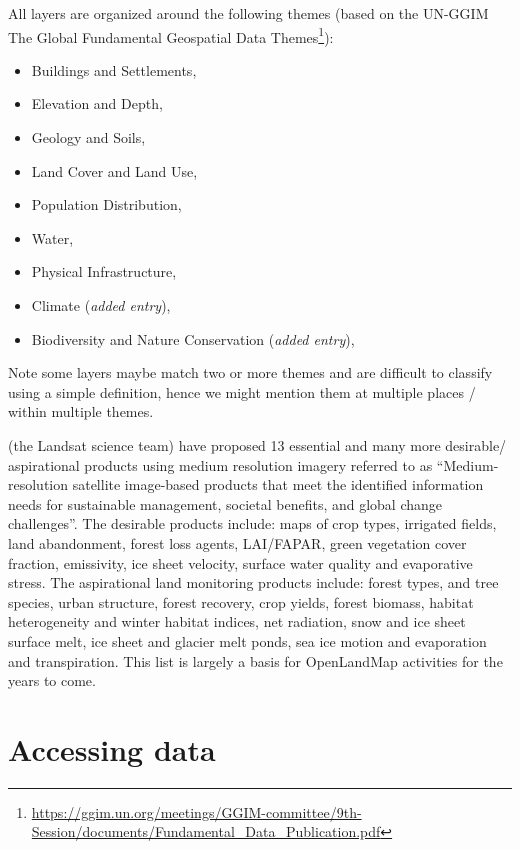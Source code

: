 \documentclass[
  graybox,natbib,nospthms]{svmono}
\providecommand{\tightlist}{%
  \setlength{\itemsep}{0pt}\setlength{\parskip}{0pt}}
\providecommand{\tightlist}{\setlength{\itemsep}{0pt}\setlength{\parskip}{0pt}}
\renewcommand{\href}[2]{#2 (\url{#1})}
\renewcommand{\href}[2]{#2\footnote{\url{#1}}}
\begin{document}
All layers are organized around the following themes
(based on the \href{https://ggim.un.org/meetings/GGIM-committee/9th-Session/documents/Fundamental_Data_Publication.pdf}{UN-GGIM The Global Fundamental Geospatial Data Themes}):

\begin{itemize}
\tightlist
\item
  Buildings and Settlements,
\item
  Elevation and Depth,
\item
  Geology and Soils,
\item
  Land Cover and Land Use,
\item
  Population Distribution,
\item
  Water,
\item
  Physical Infrastructure,
\item
  Climate (\emph{added entry}),
\item
  Biodiversity and Nature Conservation (\emph{added entry}),
\end{itemize}

Note some layers maybe match two or more themes and are difficult to classify using a
simple definition, hence we might mention them at multiple places / within multiple themes.

\citet{RADELOFF2024113918} (the Landsat science team) have proposed 13 essential and
many more desirable/ aspirational products using medium resolution imagery referred
to as ``Medium-resolution satellite image-based products that meet the identified information needs for sustainable management, societal benefits, and global change challenges''.
The desirable products include: maps of crop types, irrigated fields, land abandonment,
forest loss agents, LAI/FAPAR, green vegetation cover fraction, emissivity, ice sheet
velocity, surface water quality and evaporative stress. The aspirational land monitoring
products include: forest types, and tree species, urban structure, forest recovery, crop yields,
forest biomass, habitat heterogeneity and winter habitat indices, net radiation,
snow and ice sheet surface melt, ice sheet and glacier melt ponds, sea ice motion and
evaporation and transpiration. This list is largely a basis for OpenLandMap activities for the years to come.

\hypertarget{accessing-data}{%
\section{Accessing data}\label{accessing-data}}
\end{document}
